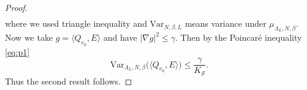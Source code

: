 \documentclass[11pt,UTF-8,reqno]{amsart}
\numberwithin{equation}{section}
\def\var{{\mathrm{Var}}}
\def\<{{\langle}}
\def\>{{\rangle}}
\def\cS{{\mathcal S}}
\def\mZ{{\mathbb Z}}
\def\leq{\leqslant}
\def\<{{\langle}}
\def\>{{\rangle}}
\def\leq{\leqslant}
\def\<{\langle} \def\>{\rangle}
\begin{document}
\begin{proof}
\begin{align*}
	\end{align*}
	where we used triangle inequality and  $\var_{N,\beta,L}$ means variance under $\mu_{\Lambda_L,N,\beta}$.
	Now we take $g=\<Q_{e_0},E\>$ and have $|\nabla g|^2\leq \gamma$. Then by the Poincar\'e inequality \eqref{eq:p1}
	$$\var_{\Lambda_L,N,\beta}\Big(\<Q_{e_0},E\>\Big)\leq \frac\gamma{K_\cS }.$$
	Thus the second result follows.
\end{proof}
\end{document}
